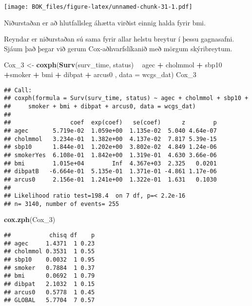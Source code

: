 \documentclass[
]{book}
\newenvironment{Shaded}{\begin{snugshade}}{\end{snugshade}}
\newcommand{\DataTypeTok}[1]{\textcolor[rgb]{0.13,0.29,0.53}{#1}}
\newcommand{\DecValTok}[1]{\textcolor[rgb]{0.00,0.00,0.81}{#1}}
\newcommand{\KeywordTok}[1]{\textcolor[rgb]{0.13,0.29,0.53}{\textbf{#1}}}
\newcommand{\NormalTok}[1]{#1}
\newcommand{\OperatorTok}[1]{\textcolor[rgb]{0.81,0.36,0.00}{\textbf{#1}}}
\newcommand{\StringTok}[1]{\textcolor[rgb]{0.31,0.60,0.02}{#1}}
\begin{document}
\texttt{[image: BOK\_files/figure-latex/unnamed-chunk-31-1.pdf]}

Niðurstaðan er að hlutfallsleg áhætta virðist einnig halda fyrir bmi.

Reyndar er niðurstaðan sú sama fyrir allar helstu breytur í þessu gagnasafni. Sjáum það þegar við gerum Cox-aðhvarfslíkanið með mörgum skýribreytum.

\begin{Shaded}
\begin{Highlighting}[]
\NormalTok{Cox_}\DecValTok{3}\NormalTok{ <-}\StringTok{ }\KeywordTok{coxph}\NormalTok{(}\KeywordTok{Surv}\NormalTok{(surv_time, status) }\OperatorTok{~}\StringTok{  }\NormalTok{agec }\OperatorTok{+}\StringTok{ }\NormalTok{cholmmol }\OperatorTok{+}\StringTok{ }\NormalTok{sbp10 }\OperatorTok{+}\NormalTok{smoker }\OperatorTok{+}\StringTok{ }\NormalTok{bmi  }\OperatorTok{+}\StringTok{ }\NormalTok{dibpat }\OperatorTok{+}\StringTok{ }\NormalTok{arcus0  , }\DataTypeTok{data =}\NormalTok{ wcgs_dat)}
\NormalTok{Cox_}\DecValTok{3}
\end{Highlighting}
\end{Shaded}

\begin{verbatim}
## Call:
## coxph(formula = Surv(surv_time, status) ~ agec + cholmmol + sbp10 + 
##     smoker + bmi + dibpat + arcus0, data = wcgs_dat)
## 
##                 coef  exp(coef)   se(coef)      z        p
## agec       5.719e-02  1.059e+00  1.135e-02  5.040 4.64e-07
## cholmmol   3.234e-01  1.382e+00  4.137e-02  7.817 5.39e-15
## sbp10      1.844e-01  1.202e+00  3.802e-02  4.849 1.24e-06
## smokerYes  6.108e-01  1.842e+00  1.319e-01  4.630 3.66e-06
## bmi        1.015e+04        Inf  4.367e+03  2.325   0.0201
## dibpatB   -6.664e-01  5.135e-01  1.371e-01 -4.861 1.17e-06
## arcus0     2.156e-01  1.241e+00  1.322e-01  1.631   0.1030
## 
## Likelihood ratio test=198.4  on 7 df, p=< 2.2e-16
## n= 3140, number of events= 255
\end{verbatim}

\begin{Shaded}
\begin{Highlighting}[]
\KeywordTok{cox.zph}\NormalTok{(Cox_}\DecValTok{3}\NormalTok{)}
\end{Highlighting}
\end{Shaded}

\begin{verbatim}
##           chisq df    p
## agec     1.4371  1 0.23
## cholmmol 0.3531  1 0.55
## sbp10    0.0032  1 0.95
## smoker   0.7884  1 0.37
## bmi      0.0692  1 0.79
## dibpat   2.1032  1 0.15
## arcus0   0.5778  1 0.45
## GLOBAL   5.7704  7 0.57
\end{verbatim}
\end{document}
